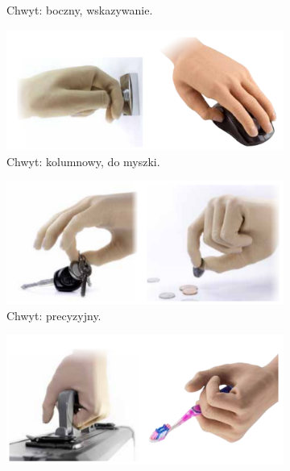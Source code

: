 \documentclass[8pt]{beamer}
\begin{document}
\begin{frame}[allowframebreaks]
\begin{center}
\begin{figure}
\begin{subfigure}[b]{0.4\textwidth}
                		\caption{Chwyt: boczny, wskazywanie.}
                		\label{graph:g3}
        			\end{subfigure}%
        			\begin{subfigure}[b]{0.4\textwidth}
                		\includegraphics[width=\textwidth]{graphics/grip4.png}
                		\caption{Chwyt: kolumnowy, do myszki.}
                		\label{graph:g4}
        			\end{subfigure}%
				\newline
        			\begin{subfigure}[b]{0.4\textwidth}
                		\includegraphics[width=\textwidth]{graphics/grip5.png}
                		\caption{Chwyt: precyzyjny.}
                		\label{graph:g5}
        			\end{subfigure}%
        			\begin{subfigure}[b]{0.4\textwidth}
                		\includegraphics[width=\textwidth]{graphics/grip6.png}

\end{subfigure}
\end{figure}
\end{center}
\end{frame}
\end{document}
